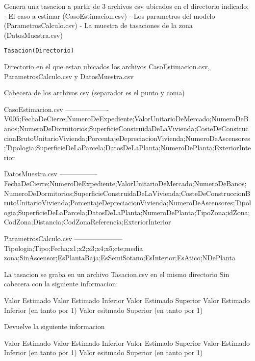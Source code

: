\documentclass[a4paper]{book}
\begin{document}
%
\begin{Description}\relax
Genera una tasacion a partir de 3 archivos csv ubicados en el directorio indicado:
- El caso a estimar (CasoEstimacion.csv)
- Los parametros del modelo (ParametrosCalculo.csv)
- La muestra de tasaciones de la zona (DatosMuestra.csv)
\end{Description}
%
\begin{Usage}
\begin{verbatim}
Tasacion(Directorio)
\end{verbatim}
\end{Usage}
%
\begin{Arguments}
\begin{ldescription}
\item[\code{Directorio}] 
Directorio en el que estan ubicados los archivos CasoEstimacion.csv, ParametrosCalculo.csv y DatosMuestra.csv

\end{ldescription}
\end{Arguments}
%
\begin{Details}\relax
Cabecera de los archivos csv (separador es el punto y coma)

CasoEstimacion.csv
-------------------
V005;FechaDeCierre;NumeroDeExpediente;ValorUnitarioDeMercado;NumeroDeBanos;NumeroDeDormitorios;SuperficieConstruidaDeLaVivienda;CosteDeConstruccionBrutoUnitarioVivienda;PorcentajeDepreciacionVivienda;NumeroDeAscensores;Tipologia;SuperficieDeLaParcela;DatosDeLaPlanta;NumeroDePlanta;ExteriorInterior

DatosMuestra.csv
-----------------
FechaDeCierre;NumeroDeExpediente;ValorUnitarioDeMercado;NumeroDeBanos;NumeroDeDormitorios;SuperficieConstruidaDeLaVivienda;CosteDeConstruccionBrutoUnitarioVivienda;PorcentajeDepreciacionVivienda;NumeroDeAscensores;Tipologia;SuperficieDeLaParcela;DatosDeLaPlanta;NumeroDePlanta;TipoZona;idZona;CodZona;Distancia;CodZonaReferencia;ExteriorInterior

ParametrosCalculo.csv
---------------------
Tipologia;Tipo;Fecha;x1;x2;x3;x4;x5;cte;media zona;SinAscensor;EsPlantaBaja;EsSemiSotano;EsInterior;EsAtico;NDePlanta

La tasacion se graba en un archivo Tasacion.csv en el mismo directorio Sin cabecera con la siguiente informacion:

Valor Estimado
Valor Estimado Inferior
Valor Estimado Superior
Valor Estimado Inferior (en tanto por 1)
Valor esitmado Superior (en tanto por 1)
\end{Details}
%
\begin{Value}
Devuelve la siguiente informacion

Valor Estimado
Valor Estimado Inferior
Valor Estimado Superior
Valor Estimado Inferior (en tanto por 1)
Valor esitmado Superior (en tanto por 1)
\end{Value}
\end{document}
